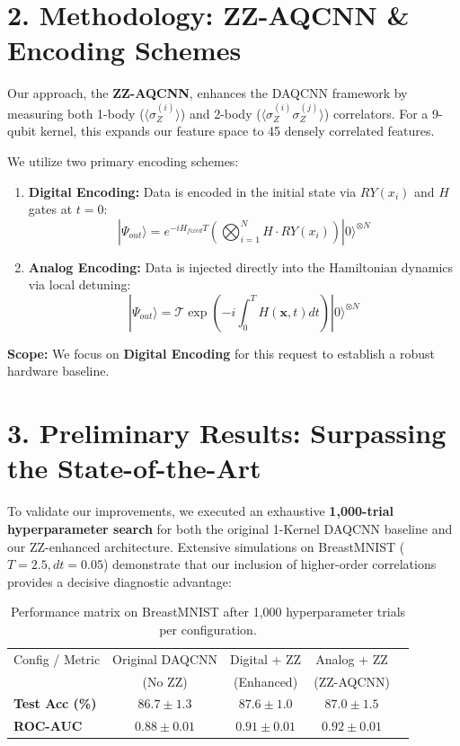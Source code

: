 \documentclass[11pt,a4paper]{article}
\begin{document}
\section*{2. Methodology: ZZ-AQCNN \& Encoding Schemes}
Our approach, the \textbf{ZZ-AQCNN}, enhances the DAQCNN framework by measuring both 1-body ($\langle \sigma_Z^{(i)} \rangle$) and 2-body ($\langle \sigma_Z^{(i)} \sigma_Z^{(j)} \rangle$) correlators. For a 9-qubit kernel, this expands our feature space to 45 densely correlated features. 

We utilize two primary encoding schemes:
\begin{enumerate}
    \item \textbf{Digital Encoding:} Data is encoded in the initial state via $RY(x_i)$ and $H$ gates at $t=0$:
    \begin{equation}
        |\Psi_{out}\rangle = e^{-i H_{fixed} T} \left( \bigotimes_{i=1}^N H \cdot RY(x_i) \right) |0\rangle^{\otimes N}
    \end{equation}
    
    \item \textbf{Analog Encoding:} Data is injected directly into the Hamiltonian dynamics via local detuning:
    \begin{equation}
        |\Psi_{out}\rangle = \mathcal{T} \exp \left( -i \int_0^T H(\mathbf{x}, t) dt \right) |0\rangle^{\otimes N}
    \end{equation}
\end{enumerate}
\textbf{Scope:} We focus on \textbf{Digital Encoding} for this request to establish a robust hardware baseline.

\section*{3. Preliminary Results: Surpassing the State-of-the-Art}
To validate our improvements, we executed an exhaustive \textbf{1,000-trial hyperparameter search} for both the original 1-Kernel DAQCNN baseline \cite{daqcnn2024} and our ZZ-enhanced architecture. Extensive simulations on BreastMNIST ($T=2.5, dt=0.05$) demonstrate that our inclusion of higher-order correlations provides a decisive diagnostic advantage:

\begin{table}[htbp]
    \centering
    \begin{tabular}{l c c c c}
        \toprule
        Config / Metric & Original DAQCNN & Digital + ZZ & Analog + ZZ \\
                         & (No ZZ) \cite{daqcnn2024} & (Enhanced) & (ZZ-AQCNN) \\
        \midrule
        \textbf{Test Acc (\%)} & $86.7 \pm 1.3$ & $\mathbf{87.6 \pm 1.0}$ & $87.0 \pm 1.5   $ \\
        \textbf{ROC-AUC}       & $0.88 \pm 0.01$ & $0.91 \pm 0.01$ & $\mathbf{0.92 \pm 0.01}$ \\
        \bottomrule
    \end{tabular}
    \caption{Performance matrix on BreastMNIST after 1,000 hyperparameter trials per configuration.}
\end{table}
\end{document}
